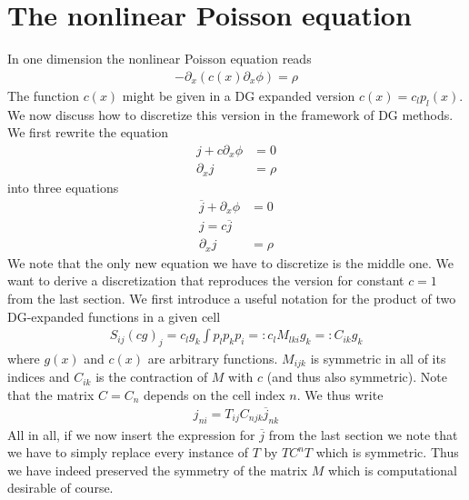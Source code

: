 \documentclass[a4paper,12pt]{scrartcl}
\begin{document}
\section{ The nonlinear Poisson equation}
In one dimension the nonlinear Poisson equation reads
\begin{align}
    -\partial_x ( c(x) \partial_x \phi) = \rho
    \label{}
\end{align}
The function $c(x)$ might be given in a DG expanded version $c(x) = c_lp_l(x)$.
We now discuss how to discretize this version in the framework of DG methods. 
We first rewrite the equation 
\begin{subequations}
    \begin{align}
      j + c\partial_x \phi &= 0\\
      \partial_x j &= \rho
        \label{}
    \end{align}
    \label{}
\end{subequations}
into three equations
\begin{subequations}
    \begin{align}
      \overline j + \partial_x \phi &= 0\\
      j = c\overline j\\
      \partial_x j &= \rho
        \label{}
    \end{align}
    \label{}
\end{subequations}
We note that the only new equation we have to discretize is the middle one.
We want to derive a discretization that 
reproduces the version for constant $c=1$ from the last section. 
We first introduce a useful notation for the product of two DG-expanded functions
in a given cell
\begin{align}
    S_{ij}(cg)_j = c_l g_k \int p_l p_k p_i =: c_l M_{lki} g_k =: C_{ik}g_k 
    \label{}
\end{align}
where $g(x)$ and $c(x)$ are arbitrary functions.
$M_{ijk}$ is symmetric in all of its indices and $C_{ik}$ is the 
contraction of $M$ with $c$ (and thus also symmetric). 
Note that the matrix $C = C_n$ 
depends on the cell index $n$. We thus write
\begin{align}
    j_{ni} = T_{ij}C_{njk}\overline j_{nk}
    \label{}
\end{align}
All in all, if we now insert the expression for $\overline j$ from the last section
we note that we have to simply replace every instance of $T$ by $TC^nT$ 
which is symmetric. Thus we have indeed preserved the symmetry of the matrix $M$ 
which is computational desirable of course. 
\end{document}
